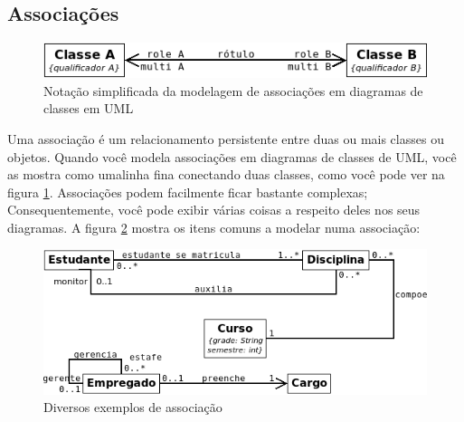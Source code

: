 \documentclass[
	article,			%
	12pt,				%
	openright,
	twoside,			%
	a4paper,			%
	english,			%
	french,
	brazil,				%
	sumario=tradicional
	]{abntex2}
\begin{document}
\subsection{Associações}

\begin{figure}
\begin{center}
\includegraphics[scale=0.6]{assocCls.png} 
\caption{Notação simplificada da modelagem de associações em diagramas de classes em UML} \label{fig:uml5}
\end{center}
\end{figure}

Uma associação é um relacionamento persistente entre duas ou mais classes ou objetos. Quando você modela associações em diagramas de classes de UML, você as mostra como umalinha fina conectando duas classes, como você pode ver na figura \ref{fig:uml5}. Associações podem facilmente ficar bastante complexas; Consequentemente, você pode exibir várias coisas a respeito deles nos seus diagramas. A figura \ref{fig:uml6} mostra os itens comuns a modelar numa associação:

\begin{figure}
\begin{center}
\includegraphics[scale=0.6]{assocCls2.png} 
\caption{Diversos exemplos de associação} \label{fig:uml6}
\end{center}
\end{figure}
\end{document}
